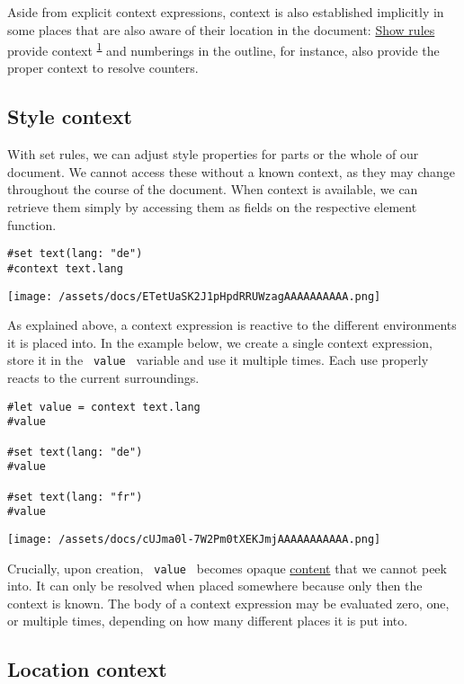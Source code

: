 Aside from explicit context expressions, context is also established
implicitly in some places that are also aware of their location in the
document: \href{/docs/reference/styling/\#show-rules}{Show rules}
provide context \textsuperscript{\hyperref[1]{1}} and numberings in the
outline, for instance, also provide the proper context to resolve
counters.

\subsection{Style context}\label{style-context}

With set rules, we can adjust style properties for parts or the whole of
our document. We cannot access these without a known context, as they
may change throughout the course of the document. When context is
available, we can retrieve them simply by accessing them as fields on
the respective element function.

\begin{verbatim}
#set text(lang: "de")
#context text.lang
\end{verbatim}

\texttt{[image: /assets/docs/ETetUaSK2J1pHpdRRUWzagAAAAAAAAAA.png]}

As explained above, a context expression is reactive to the different
environments it is placed into. In the example below, we create a single
context expression, store it in the \texttt{\ value\ } variable and use
it multiple times. Each use properly reacts to the current surroundings.

\begin{verbatim}
#let value = context text.lang
#value

#set text(lang: "de")
#value

#set text(lang: "fr")
#value
\end{verbatim}

\texttt{[image: /assets/docs/cUJma0l-7W2Pm0tXEKJmjAAAAAAAAAAA.png]}

Crucially, upon creation, \texttt{\ value\ } becomes opaque
\href{/docs/reference/foundations/content/}{content} that we cannot peek
into. It can only be resolved when placed somewhere because only then
the context is known. The body of a context expression may be evaluated
zero, one, or multiple times, depending on how many different places it
is put into.

\subsection{Location context}\label{location-context}

